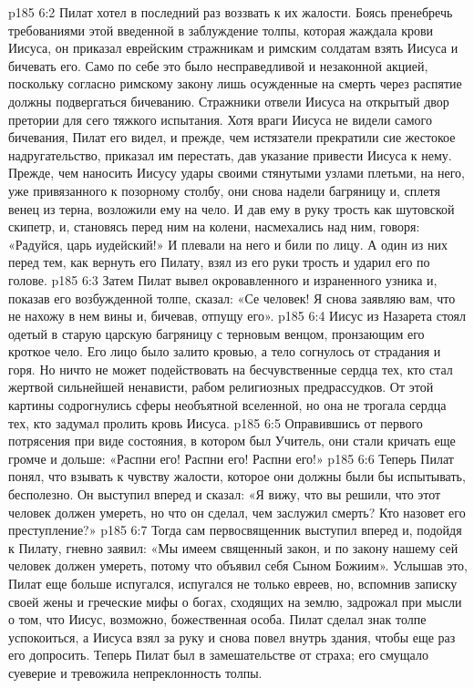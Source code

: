 \vs p185 6:2 Пилат хотел в последний раз воззвать к их жалости. Боясь пренебречь требованиями этой введенной в заблуждение толпы, которая жаждала крови Иисуса, он приказал еврейским стражникам и римским солдатам взять Иисуса и бичевать его. Само по себе это было несправедливой и незаконной акцией, поскольку согласно римскому закону лишь осужденные на смерть через распятие должны подвергаться бичеванию. Стражники отвели Иисуса на открытый двор претории для сего тяжкого испытания. Хотя враги Иисуса не видели самого бичевания, Пилат его видел, и прежде, чем истязатели прекратили сие жестокое надругательство, приказал им перестать, дав указание привести Иисуса к нему. Прежде, чем наносить Иисусу удары своими стянутыми узлами плетьми, на него, уже привязанного к позорному столбу, они снова надели багряницу и, сплетя венец из терна, возложили ему на чело. И дав ему в руку трость как шутовской скипетр, и, становясь перед ним на колени, насмехались над ним, говоря: «Радуйся, царь иудейский!» И плевали на него и били по лицу. А один из них перед тем, как вернуть его Пилату, взял из его руки трость и ударил его по голове.
\vs p185 6:3 Затем Пилат вывел окровавленного и израненного узника и, показав его возбужденной толпе, сказал: «Се человек! Я снова заявляю вам, что не нахожу в нем вины и, бичевав, отпущу его».
\vs p185 6:4 Иисус из Назарета стоял одетый в старую царскую багряницу с терновым венцом, пронзающим его кроткое чело. Его лицо было залито кровью, а тело согнулось от страдания и горя. Но ничто не может подействовать на бесчувственные сердца тех, кто стал жертвой сильнейшей ненависти, рабом религиозных предрассудков. От этой картины содрогнулись сферы необъятной вселенной, но она не трогала сердца тех, кто задумал пролить кровь Иисуса.
\vs p185 6:5 Оправившись от первого потрясения при виде состояния, в котором был Учитель, они стали кричать еще громче и дольше: «Распни его! Распни его! Распни его!»
\vs p185 6:6 Теперь Пилат понял, что взывать к чувству жалости, которое они должны были бы испытывать, бесполезно. Он выступил вперед и сказал: «Я вижу, что вы решили, что этот человек должен умереть, но что он сделал, чем заслужил смерть? Кто назовет его преступление?»
\vs p185 6:7 Тогда сам первосвященник выступил вперед и, подойдя к Пилату, гневно заявил: «Мы имеем священный закон, и по закону нашему сей человек должен умереть, потому что объявил себя Сыном Божиим». Услышав это, Пилат еще больше испугался, испугался не только евреев, но, вспомнив записку своей жены и греческие мифы о богах, сходящих на землю, задрожал при мысли о том, что Иисус, возможно, божественная особа. Пилат сделал знак толпе успокоиться, а Иисуса взял за руку и снова повел внутрь здания, чтобы еще раз его допросить. Теперь Пилат был в замешательстве от страха; его смущало суеверие и тревожила непреклонность толпы.
